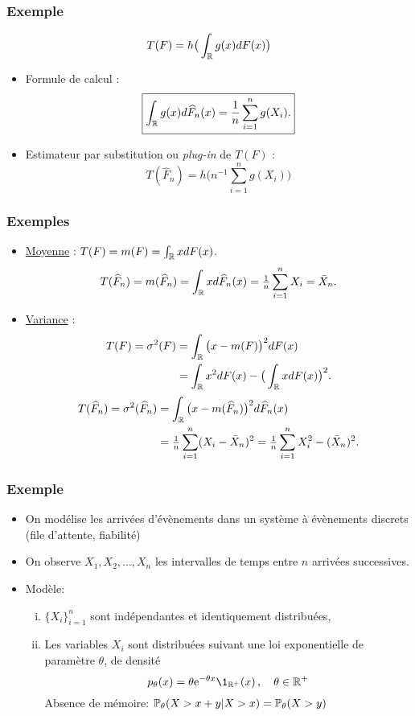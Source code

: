 \begin{frame}
\frametitle{Exemple}
$$
T(F) = h\big(\int_{\operatorname{{\mathbb R}}}g(x)dF(x)\big)
$$
\begin{itemize}
\item \alert{Formule de calcul} :
$$\boxed{\int_{\operatorname{{\mathbb R}}}g(x)d\widehat F_n(x) =
\frac{1}{n}\sum_{i = 1}^n g(X_i).}$$
\item Estimateur par \alert{substitution} ou {\it plug-in} de $T(F)$ :
$$\boxed{T(\widehat F_n) = h\Big(n^{-1} \sum_{i = 1}^ng(X_i)\Big)}$$
\end{itemize} 
\end{frame}




\begin{frame}
\frametitle{Exemples}
\begin{itemize}
\item \underline{Moyenne} : $T(F)=m(F) = \int_{\operatorname{{\mathbb R}}}xdF(x)$.
$$
T(\widehat F_n)=m(\widehat F_n)=\int _{\operatorname{{\mathbb R}}}xd\widehat F_n(x)=
\tfrac{1}{n}\sum_{i = 1}^n X_i  = \bar X_n.
$$
\item \underline{Variance} :
\begin{align*}
T(F)=\sigma^2(F) & = \int_{\operatorname{{\mathbb R}}}\big(x-m(F)\big)^2dF(x)\\
& = \int_{\operatorname{{\mathbb R}}}x^2 dF(x)-\big(\int_{\operatorname{{\mathbb R}}}xdF(x)\big)^2.
\end{align*}
\begin{align*}
T(\widehat F_n)=\sigma^2(\widehat F_n) & =
\int_{\operatorname{{\mathbb R}}}\big(x-m(\widehat F_n)\big)^2d\widehat F_n(x) \\
& = \tfrac{1}{n}\sum_{i = 1}^n (X_i-\bar X_n)^2= \tfrac{1}{n}\sum_{i
= 1}^n X_i^2-(\bar X_n)^2.
\end{align*}
\end{itemize}
\end{frame}

\begin{frame}
\frametitle{Exemple}
\begin{itemize}
\item On modélise les arrivées d'évènements dans un système à évènements discrets (file d'attente, fiabilité)
\item On observe $X_1,X_2,\dots,X_n$ les intervalles de temps entre $n$ arrivées successives.
\item \alert{Modèle}:
\begin{enumerate}[(i)]
\item $\{X_i\}_{i=1}^n$ sont indépendantes et identiquement distribuées,
\item Les variables $X_i$ sont distribuées suivant une loi exponentielle de paramètre $\theta$, de densité
    $$
    p_\theta(x) = \theta \rme^{-\theta x} \1_{\rset^+}(x) \eqsp, \quad \theta \in \rset^+
    $$
    \alert{Absence de mémoire:} $\operatorname{{\mathbb P}}_\theta(X > x + y | X > x)= \operatorname{{\mathbb P}}_\theta(X > y)$
\end{enumerate}
\end{itemize}
\end{frame}

